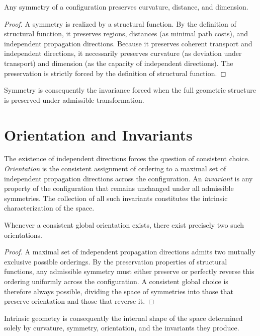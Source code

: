 \documentclass[12pt,anyside]{book}
\newcommand{\term}[1]{\textit{#1}}             %
\begin{document}
\begin{theorem}
Any symmetry of a configuration preserves curvature, distance, and dimension.
\end{theorem}

\begin{proof}
A symmetry is realized by a structural function. By the definition of structural function, it preserves regions, distances (as minimal path costs), and independent propagation directions. Because it preserves coherent transport and independent directions, it necessarily preserves curvature (as deviation under transport) and dimension (as the capacity of independent directions). The preservation is strictly forced by the definition of structural function.
\end{proof}

Symmetry is consequently the invariance forced when the full geometric structure is preserved under admissible transformation.

\section{Orientation and Invariants}
The existence of independent directions forces the question of consistent choice. \term{Orientation} is the consistent assignment of ordering to a maximal set of independent propagation directions across the configuration. An \term{invariant} is any property of the configuration that remains unchanged under all admissible symmetries. The collection of all such invariants constitutes the intrinsic characterization of the space.

\begin{theorem}
Whenever a consistent global orientation exists, there exist precisely two such orientations.
\end{theorem}

\begin{proof}
A maximal set of independent propagation directions admits two mutually exclusive possible orderings. By the preservation properties of structural functions, any admissible symmetry must either preserve or perfectly reverse this ordering uniformly across the configuration. A consistent global choice is therefore always possible, dividing the space of symmetries into those that preserve orientation and those that reverse it.
\end{proof}

Intrinsic geometry is consequently the internal shape of the space determined solely by curvature, symmetry, orientation, and the invariants they produce.
\end{document}
